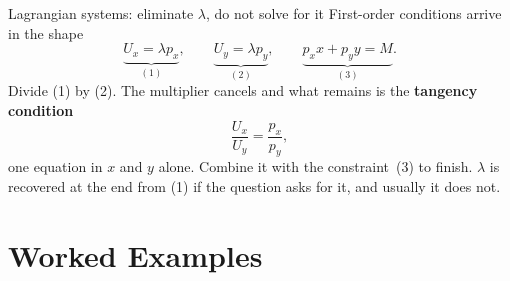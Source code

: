 \begin{rulebox}{Lagrangian systems: eliminate $\lambda$, do not solve for it}
First-order conditions arrive in the shape
\[
  \underbrace{U_{x}=\lambda p_{x}}_{(1)},\qquad
  \underbrace{U_{y}=\lambda p_{y}}_{(2)},\qquad
  \underbrace{p_{x}x+p_{y}y=M}_{(3)} .
\]
Divide (1) by (2). The multiplier cancels and what remains is the
\textbf{tangency condition}
\[
  \frac{U_{x}}{U_{y}}=\frac{p_{x}}{p_{y}} ,
\]
one equation in $x$ and $y$ alone. Combine it with the constraint~(3) to
finish. $\lambda$ is recovered at the end from (1) if the question asks for
it, and usually it does not.
\end{rulebox}

\section{Worked Examples}

